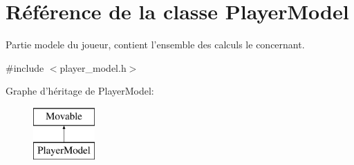 \hypertarget{class_player_model}{\section{Référence de la classe Player\+Model}
\label{class_player_model}
}


Partie modele du joueur, contient l'ensemble des calculs le concernant.  




{\ttfamily \#include $<$player\+\_\+model.\+h$>$}

Graphe d'héritage de Player\+Model\+:\begin{figure}[H]
\begin{center}
\leavevmode
\includegraphics[height=2.000000cm]{class_player_model}
\end{center}
\end{figure}
